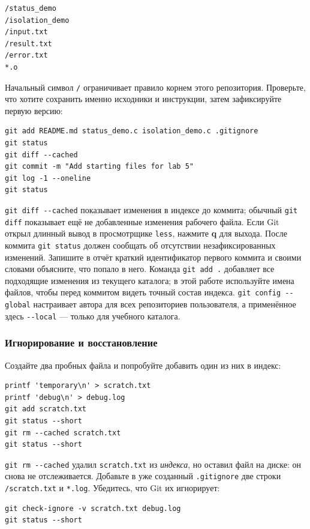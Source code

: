 \begin{verbatim}
/status_demo
/isolation_demo
/input.txt
/result.txt
/error.txt
*.o
\end{verbatim}

Начальный символ \texttt{/} ограничивает правило корнем этого репозитория.
Проверьте, что хотите сохранить именно исходники и инструкции, затем
зафиксируйте первую версию:

\begin{verbatim}
git add README.md status_demo.c isolation_demo.c .gitignore
git status
git diff --cached
git commit -m "Add starting files for lab 5"
git log -1 --oneline
git status
\end{verbatim}

\texttt{git diff -{}-cached} показывает изменения в индексе до коммита;
обычный \texttt{git diff} показывает ещё не добавленные изменения рабочего
файла. Если Git открыл длинный вывод в просмотрщике \texttt{less}, нажмите
\textbf{q} для выхода. После коммита \texttt{git status} должен сообщать об отсутствии
незафиксированных изменений. Запишите в отчёт краткий идентификатор первого
коммита и своими словами объясните, что попало в него. Команда
\mbox{\texttt{git add .}} добавляет все подходящие изменения из текущего каталога;
в этой работе используйте имена файлов, чтобы перед коммитом видеть
точный состав индекса. \texttt{git config -{}-global} настраивает автора
для всех репозиториев пользователя, а применённое здесь
\texttt{-{}-local} --- только для учебного каталога.

\subsubsection*{Игнорирование и восстановление}

Создайте два пробных файла и попробуйте добавить один из них в индекс:

\begin{verbatim}
printf 'temporary\n' > scratch.txt
printf 'debug\n' > debug.log
git add scratch.txt
git status --short
git rm --cached scratch.txt
git status --short
\end{verbatim}

\texttt{git rm -{}-cached} удалил \texttt{scratch.txt} из \emph{индекса},
но оставил файл на диске: он снова не отслеживается. Добавьте в уже
созданный \texttt{.gitignore} две строки \texttt{/scratch.txt} и
\texttt{*.log}. Убедитесь, что Git их игнорирует:

\begin{verbatim}
git check-ignore -v scratch.txt debug.log
git status --short
\end{verbatim}

